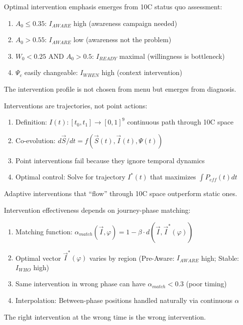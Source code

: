 \begin{theorem}
Optimal intervention emphasis emerges from 10C status quo assessment:
\begin{enumerate}
\item $A_0 \leq 0.35$: $I_{AWARE}$ high (awareness campaign needed)
\item $A_0 > 0.55$: $I_{AWARE}$ low (awareness not the problem)
\item $W_0 < 0.25$ AND $A_0 > 0.5$: $I_{READY}$ maximal (willingness is bottleneck)
\item $\Psi_c$ easily changeable: $I_{WHEN}$ high (context intervention)
\end{enumerate}
The intervention profile is not chosen from menu but emerges from diagnosis.
\end{theorem}

\begin{theorem}
Interventions are trajectories, not point actions:
\begin{enumerate}
\item Definition: $I(t): [t_0, t_1] \to [0,1]^9$ continuous path through 10C space
\item Co-evolution: $d\vec{S}/dt = f(\vec{S}(t), \vec{I}(t), \Psi(t))$
\item Point interventions fail because they ignore temporal dynamics
\item Optimal control: Solve for trajectory $I^*(t)$ that maximizes $\int P_{eff}(t) dt$
\end{enumerate}
Adaptive interventions that ``flow'' through 10C space outperform static ones.
\end{theorem}

\begin{theorem}
Intervention effectiveness depends on journey-phase matching:
\begin{enumerate}
\item Matching function: $\alpha_{match}(\vec{I}, \varphi) = 1 - \beta \cdot d(\vec{I}, \vec{I}^*(\varphi))$
\item Optimal vector $\vec{I}^*(\varphi)$ varies by region (Pre-Aware: $I_{AWARE}$ high; Stable: $I_{WHO}$ high)
\item Same intervention in wrong phase can have $\alpha_{match} < 0.3$ (poor timing)
\item Interpolation: Between-phase positions handled naturally via continuous $\alpha$
\end{enumerate}
The right intervention at the wrong time is the wrong intervention.
\end{theorem}

